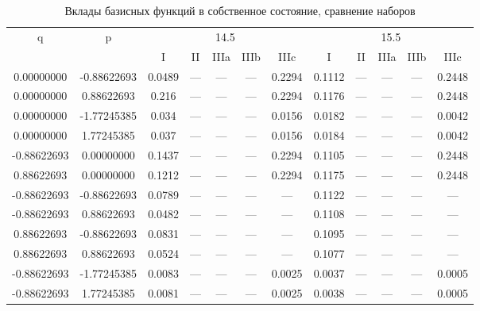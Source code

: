 \documentclass[a4paper,14pt]{extarticle}
\begin{document}
\begin{landscape}
\begin{table}[H]
\centering
\caption{Вклады базисных функций в собственное состояние, сравнение наборов}
\begin{tabular}{|c|c|*{5}{c}|*{5}{c}|}
\hline
\multirow{2}{*}{q} & \multirow{2}{*}{p} & \multicolumn{5}{|c|}{14.5}                  & \multicolumn{5}{|c|}{15.5}                \\
\cline{3-12}
                   &                    & I      & II     & IIIa   & IIIb   & IIIc   & I      & II     & IIIa   & IIIb   & IIIc   \\ 
\hline
 0.00000000        & -0.88622693        & 0.0489 & ---    & ---    & ---    & 0.2294 & 0.1112 & ---    & ---    & ---    & 0.2448 \\ 
 0.00000000        &  0.88622693        & 0.216  & ---    & ---    & ---    & 0.2294 & 0.1176 & ---    & ---    & ---    & 0.2448 \\                  
 0.00000000        & -1.77245385        & 0.034  & ---    & ---    & ---    & 0.0156 & 0.0182 & ---    & ---    & ---    & 0.0042 \\ 
 0.00000000        &  1.77245385        & 0.037  & ---    & ---    & ---    & 0.0156 & 0.0184 & ---    & ---    & ---    & 0.0042 \\ 
-0.88622693        &  0.00000000        & 0.1437 & ---    & ---    & ---    & 0.2294 & 0.1105 & ---    & ---    & ---    & 0.2448 \\ 
 0.88622693        &  0.00000000        & 0.1212 & ---    & ---    & ---    & 0.2294 & 0.1175 & ---    & ---    & ---    & 0.2448 \\ 
-0.88622693        & -0.88622693        & 0.0789 & ---    & ---    & ---    & ---    & 0.1122 & ---    & ---    & ---    & ---    \\ 
-0.88622693        &  0.88622693        & 0.0482 & ---    & ---    & ---    & ---    & 0.1108 & ---    & ---    & ---    & ---    \\ 
 0.88622693        & -0.88622693        & 0.0831 & ---    & ---    & ---    & ---    & 0.1095 & ---    & ---    & ---    & ---    \\ 
 0.88622693        &  0.88622693        & 0.0524 & ---    & ---    & ---    & ---    & 0.1077 & ---    & ---    & ---    & ---    \\ 
-0.88622693        & -1.77245385        & 0.0083 & ---    & ---    & ---    & 0.0025 & 0.0037 & ---    & ---    & ---    & 0.0005 \\ 
-0.88622693        &  1.77245385        & 0.0081 & ---    & ---    & ---    & 0.0025 & 0.0038 & ---    & ---    & ---    & 0.0005 \\ 

\end{tabular}
\end{table}
\end{landscape}
\end{document}
